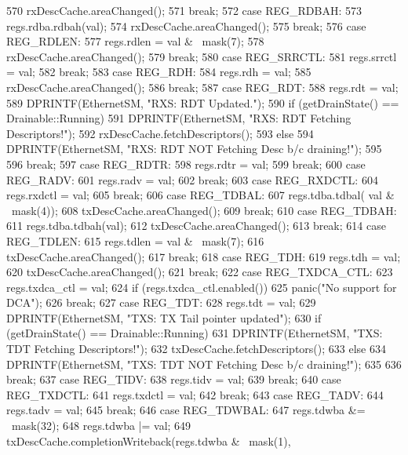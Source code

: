 \begin{DoxyCode}
{{570         rxDescCache.areaChanged();
571         break;
572       case REG_RDBAH:
573         regs.rdba.rdbah(val);
574         rxDescCache.areaChanged();
575         break;
576       case REG_RDLEN:
577         regs.rdlen = val & ~mask(7);
578         rxDescCache.areaChanged();
579         break;
580       case REG_SRRCTL:
581         regs.srrctl = val;
582         break;
583       case REG_RDH:
584         regs.rdh = val;
585         rxDescCache.areaChanged();
586         break;
587       case REG_RDT:
588         regs.rdt = val;
589         DPRINTF(EthernetSM, "RXS: RDT Updated.\n");
590         if (getDrainState() == Drainable::Running) {
591             DPRINTF(EthernetSM, "RXS: RDT Fetching Descriptors!\n");
592             rxDescCache.fetchDescriptors();
593         } else {
594             DPRINTF(EthernetSM, "RXS: RDT NOT Fetching Desc b/c draining!\n");
595         }
596         break;
597       case REG_RDTR:
598         regs.rdtr = val;
599         break;
600       case REG_RADV:
601         regs.radv = val;
602         break;
603       case REG_RXDCTL:
604         regs.rxdctl = val;
605         break;
606       case REG_TDBAL:
607         regs.tdba.tdbal( val & ~mask(4));
608         txDescCache.areaChanged();
609         break;
610       case REG_TDBAH:
611         regs.tdba.tdbah(val);
612         txDescCache.areaChanged();
613         break;
614       case REG_TDLEN:
615         regs.tdlen = val & ~mask(7);
616         txDescCache.areaChanged();
617         break;
618       case REG_TDH:
619         regs.tdh = val;
620         txDescCache.areaChanged();
621         break;
622       case REG_TXDCA_CTL:
623         regs.txdca_ctl = val;
624         if (regs.txdca_ctl.enabled())
625             panic("No support for DCA\n");
626         break;
627       case REG_TDT:
628         regs.tdt = val;
629         DPRINTF(EthernetSM, "TXS: TX Tail pointer updated\n");
630         if (getDrainState() == Drainable::Running) {
631             DPRINTF(EthernetSM, "TXS: TDT Fetching Descriptors!\n");
632             txDescCache.fetchDescriptors();
633         } else {
634             DPRINTF(EthernetSM, "TXS: TDT NOT Fetching Desc b/c draining!\n");
635         }
636         break;
637       case REG_TIDV:
638         regs.tidv = val;
639         break;
640       case REG_TXDCTL:
641         regs.txdctl = val;
642         break;
643       case REG_TADV:
644         regs.tadv = val;
645         break;
646       case REG_TDWBAL:
647         regs.tdwba &= ~mask(32);
648         regs.tdwba |= val;
649         txDescCache.completionWriteback(regs.tdwba & ~mask(1),
}}
\end{DoxyCode}
